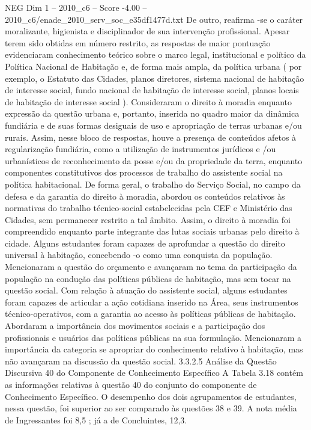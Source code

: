 \begin{textsample}{NEG Dim 1 – 2010\_c6 – Score -4.00 – 2010\_c6/enade\_2010\_serv\_soc\_e35df1477d.txt}
De outro, reafirma -se o caráter moralizante, higienista e disciplinador de sua intervenção profissional.
Apesar terem sido obtidas em número restrito, as respostas de maior pontuação evidenciaram conhecimento teórico sobre o marco legal, institucional e político da Política Nacional de Habitação e, de forma mais ampla, da política urbana ( por exemplo, o Estatuto das Cidades, planos diretores, sistema nacional de habitação de interesse social, fundo nacional de habitação de interesse social, planos locais de habitação de interesse social ).
Consideraram o direito à moradia enquanto expressão da questão urbana e, portanto, inserida no quadro maior da dinâmica fundiária e de suas formas desiguais de uso e apropriação de terras urbanas e/ou rurais.
Assim, nesse bloco de respostas, houve a presença de conteúdos afetos à regularização fundiária, como a utilização de instrumentos jurídicos e /ou urbanísticos de reconhecimento da posse e/ou da propriedade da terra, enquanto componentes constitutivos dos processos de trabalho do assistente social na política habitacional.
De forma geral, o trabalho do Serviço Social, no campo da defesa e da garantia do direito à moradia, abordou os conteúdos relativos às normativas do trabalho técnico-social estabelecidas pela CEF e Ministério das Cidades, sem permanecer restrito a tal âmbito.
Assim, o direito à moradia foi compreendido enquanto parte integrante das lutas sociais urbanas pelo direito à cidade.
Alguns estudantes foram capazes de aprofundar a questão do direito universal à habitação, concebendo -o como uma conquista da população.
Mencionaram a questão do orçamento e avançaram no tema da participação da população na condução das políticas públicas de habitação, mas sem tocar na questão social.
Com relação à atuação do assistente social, alguns estudantes foram capazes de articular a ação cotidiana inserido na Área, seus instrumentos técnico-operativos, com a garantia ao acesso às políticas públicas de habitação.
Abordaram a importância dos movimentos sociais e a participação dos profissionais e usuários das políticas públicas na sua formulação.
Mencionaram a importância da categoria se apropriar do conhecimento relativo à habitação, mas não avançaram na discussão da questão social. 3.3.2.5 Análise da Questão Discursiva 40 do Componente de Conhecimento Específico A Tabela 3.18 contém as informações relativas à questão 40 do conjunto do componente de Conhecimento Específico.
O desempenho dos dois agrupamentos de estudantes, nessa questão, foi superior ao ser comparado às questões 38 e 39.
A nota média de Ingressantes foi 8,5 ; já a de Concluintes, 12,3.

\end{textsample}
